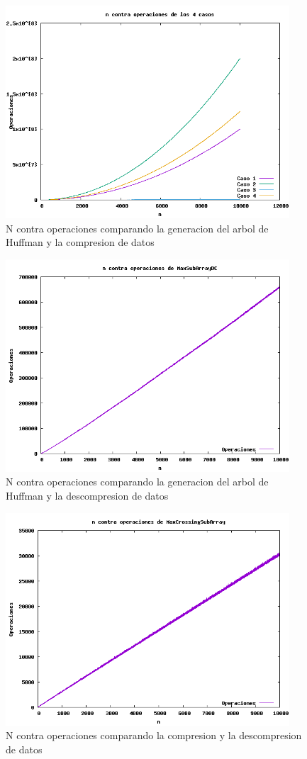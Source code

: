 \documentclass[spanish]{article}
\begin{document}
	\begin{figure}[H]
		\centering
		\includegraphics[width=400px,height=300px]{grafica7}
		\caption{N contra operaciones comparando la generacion del arbol de Huffman y la compresion de datos}
	\end{figure}
	\begin{figure}[H]
		\centering
		\includegraphics[width=400px,height=300px]{grafica8}
		\caption{N contra operaciones comparando la generacion del arbol de Huffman y la descompresion de datos}
	\end{figure}
	\begin{figure}[H]
		\centering
		\includegraphics[width=400px,height=300px]{grafica9}
		\caption{N contra operaciones comparando la compresion y la descompresion de datos}
	\end{figure}
\end{document}

